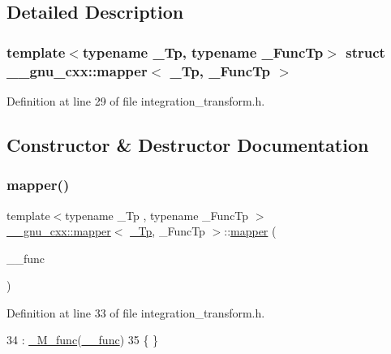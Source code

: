 \subsection{Detailed Description}
\subsubsection*{template$<$typename \+\_\+\+Tp, typename \+\_\+\+Func\+Tp$>$\newline
struct \+\_\+\+\_\+gnu\+\_\+cxx\+::mapper$<$ \+\_\+\+Tp, \+\_\+\+Func\+Tp $>$}



Definition at line 29 of file integration\+\_\+transform.\+h.



\subsection{Constructor \& Destructor Documentation}
\mbox{\label{struct____gnu__cxx_1_1mapper_ae62b3c36179d502b8cf8ca670031d650}} 
\subsubsection{\texorpdfstring{mapper()}{mapper()}}
{\footnotesize\ttfamily template$<$typename \+\_\+\+Tp , typename \+\_\+\+Func\+Tp $>$ \\
\hyperlink{struct____gnu__cxx_1_1mapper}{\+\_\+\+\_\+gnu\+\_\+cxx\+::mapper}$<$ \hyperlink{namespace____gnu__cxx_a3b19a9c800ca194374ef9172290f7d79}{\+\_\+\+Tp}, \+\_\+\+Func\+Tp $>$\+::\hyperlink{struct____gnu__cxx_1_1mapper}{mapper} (\begin{DoxyParamCaption}\item[{\+\_\+\+Func\+Tp}]{\+\_\+\+\_\+func }\end{DoxyParamCaption})\hspace{0.3cm}{\ttfamily [inline]}}



Definition at line 33 of file integration\+\_\+transform.\+h.


\begin{DoxyCode}
34       : \hyperlink{struct____gnu__cxx_1_1mapper_a577a510fcb97643f3681a251a3a7acca}{\_M\_func}(\hyperlink{namespace____gnu__cxx_af2b2f0c7a2ae72b922b1afefae5a65b2}{\_\_func})
35       \{ \}
\end{DoxyCode}



